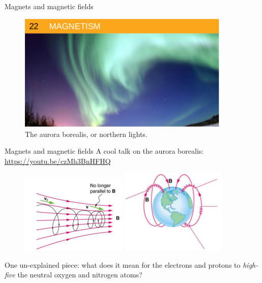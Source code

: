 \documentclass{beamer}
\begin{document}
\begin{frame}{Magnets and magnetic fields}
\begin{figure}
\centering
\includegraphics[width=0.9\textwidth]{figures/aurora.png}
\caption{\label{fig:aurora} The aurora borealis, or northern lights.}
\end{figure}
\end{frame}

\begin{frame}{Magnets and magnetic fields}
A cool talk on the aurora borealis:
\url{https://youtu.be/czMh3BnHFHQ} \\
\begin{figure}
\centering
\includegraphics[width=0.45\textwidth]{figures/mag1.png}
\includegraphics[width=0.45\textwidth]{figures/mag2.png}
\end{figure}
One un-explained piece: what does it mean for the electrons and protons to \textit{high-five} the neutral oxygen and nitrogen atoms?
\end{frame}
\end{document}

